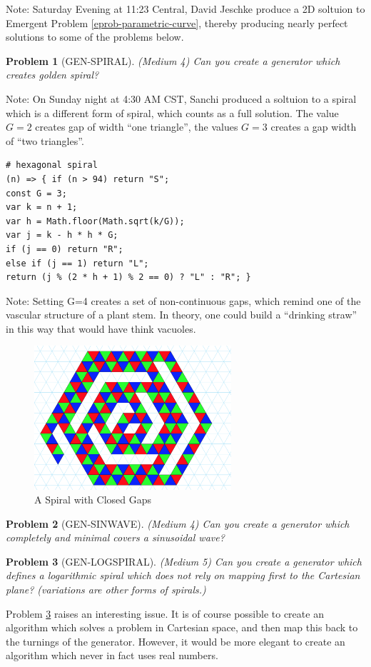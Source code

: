 \documentclass[11pt]{article}
\newtheorem{problem}{Problem}
\begin{document}
Note: Saturday Evening at 11:23 Central, David Jeschke produce a 2D soltuion to Emergent Problem \ref{eprob-parametric-curve}, thereby producing nearly
perfect solutions to some of the problems below.




\begin{problem}[GEN-SPIRAL]
  (Medium 4) Can you create a generator which creates golden spiral?
\end{problem}

Note: On Sunday night at 4:30 AM CST, Sanchi produced a soltuion to a spiral which is a different form of spiral,
which counts as a full solution. The value $G=2$ creates gap of width ``one triangle'', the values $G=3$ creates a gap width of ``two triangles''.


\begin{verbatim}
# hexagonal spiral 
(n) => { if (n > 94) return "S"; 
const G = 3;
var k = n + 1; 
var h = Math.floor(Math.sqrt(k/G)); 
var j = k - h * h * G; 
if (j == 0) return "R"; 
else if (j == 1) return "L"; 
return (j % (2 * h + 1) % 2 == 0) ? "L" : "R"; }
\end{verbatim}

Note: Setting G=4 creates a set of non-continuous gaps, which remind one of the vascular structure of a plant stem. In theory,
one could build a ``drinking straw'' in this way that would have think vacuoles.

\begin{figure}
     \centering
     \includegraphics[width=0.65\textwidth]{figures/SpiralWithClosedGaps.png}
     \caption{A Spiral with Closed Gaps}
  \label{fig:equitetrabeam}
\end{figure}

\begin{problem}[GEN-SINWAVE]
  (Medium 4) Can you create a generator which completely and minimal covers a sinusoidal wave?
\end{problem}
\begin{problem}[GEN-LOGSPIRAL]
  \label{probgenlogspiral}
  (Medium 5) Can you create a generator which defines a logarithmic spiral which does not rely on mapping first to the Cartesian plane?
  (variations are other forms of spirals.)
\end{problem}
Problem \ref{probgenlogspiral} raises an interesting issue. It is of course possible to create an algorithm which solves a problem in Cartesian space, and then
map this back to the turnings of the generator. However, it would be more elegant to create an algorithm which never in fact uses real numbers.
\end{document}
